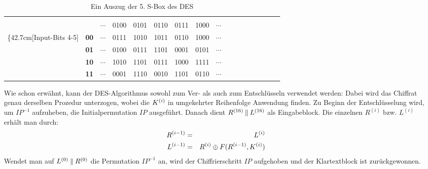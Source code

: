 \begin{table}[h]
	\hspace{-0.5cm}
	\begin{tabularx}{0.8\textwidth}{ r | >{\bfseries}Br | Cc | Cc | Cc | Cc | Cc | Cc | Cc |} 
		&  \\
		& &  \textbf{ $\cdots$ } & \rowstyle{\bfseries}0100 & 0101 & 0110 & 0111 & 1000 & \textbf{$\cdots$} \\ 
		\ldelim\{{4}{2.7cm}[Input-Bits 4-5]
		& 00 & $\cdots$ & 0111 & 1010 & 1011 & 0110 & 1000 & $\cdots$ \\ 
		& 01 & $\cdots$ & 0100 & 0111 & 1101 & 0001 & 0101 & $\cdots$ \\ 
		& 10 & $\cdots$ & 1010 & 1101 & 0111 & 1000 & 1111 & $\cdots$ \\ 
		& 11 & $\cdots$ & 0001 & 1110 & 0010 & 1101 & 0110 & $\cdots$ \\
	\end{tabularx}
	\caption{Ein Auszug der 5. S-Box des DES \indexSBOX}
	\label{ssec:des:tbl:s-box}
\end{table}

Wie schon erwähnt, kann der DES-Algorithmus sowohl zum Ver- als auch zum Entschlüsseln verwendet werden: Dabei wird das Chiffrat genau derselben Prozedur unterzogen, wobei die $K^{(i)}$ in umgekehrter Reihenfolge Anwendung finden. Zu Beginn der Entschlüsselung wird, um $IP^{-1}$ aufzuheben, die Initialpermutation $IP$ ausgeführt. Danach dient $R^{(16)} \mathbin{\|} L^{(16)}$ als Eingabeblock. Die einzelnen $R^{(i)}$ bzw. $L^{(i)}$ erhält man durch:
\begin{eqnarray*}
	R^{(i-1)}	& = 	& L^{(i)} \\
	L^{(i-1)}	& = 	& R^{(i)} \oplus F(R^{(i-1)}, K^{(i)})
\end{eqnarray*}
Wendet man auf $L^{(0)} \mathbin{\|} R^{(0)}$ die Permutation $IP^{-1}$ an, wird der Chiffrierschritt $IP$ aufgehoben und der Klartextblock ist zurückgewonnen.

